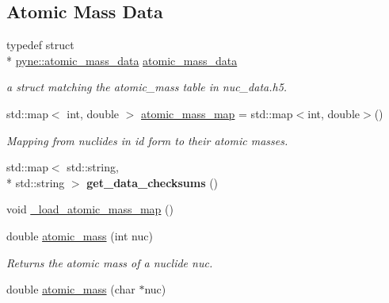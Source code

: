 \subsection*{Atomic Mass Data}
\begin{DoxyCompactItemize}
\item 
\hypertarget{namespacepyne_a4d33f77321c43a895b32c56b0c4b9256}{typedef struct \\*
\hyperlink{structpyne_1_1atomic__mass__data}{pyne\+::atomic\+\_\+mass\+\_\+data} \hyperlink{namespacepyne_a4d33f77321c43a895b32c56b0c4b9256}{atomic\+\_\+mass\+\_\+data}}\label{namespacepyne_a4d33f77321c43a895b32c56b0c4b9256}

\begin{DoxyCompactList}\small\item\em a struct matching the atomic\+\_\+mass table in nuc\+\_\+data.\+h5. \end{DoxyCompactList}\item 
\hypertarget{namespacepyne_ad57b70e4dd814b1efc458ff58641bcef}{std\+::map$<$ int, double $>$ \hyperlink{namespacepyne_ad57b70e4dd814b1efc458ff58641bcef}{atomic\+\_\+mass\+\_\+map} = std\+::map$<$int, double$>$()}\label{namespacepyne_ad57b70e4dd814b1efc458ff58641bcef}

\begin{DoxyCompactList}\small\item\em Mapping from nuclides in id form to their atomic masses. \end{DoxyCompactList}\item 
\hypertarget{namespacepyne_a7ffac869653ccaac71a565704630ae43}{std\+::map$<$ std\+::string, \\*
std\+::string $>$ {\bfseries get\+\_\+data\+\_\+checksums} ()}\label{namespacepyne_a7ffac869653ccaac71a565704630ae43}

\item 
void \hyperlink{namespacepyne_afc84ecca5a23b416bd3bf42b0756e68e}{\+\_\+load\+\_\+atomic\+\_\+mass\+\_\+map} ()
\item 
double \hyperlink{namespacepyne_aaab79c2417fc60c1a248dd702403befb}{atomic\+\_\+mass} (int nuc)
\begin{DoxyCompactList}\small\item\em Returns the atomic mass of a nuclide {\itshape nuc}. \end{DoxyCompactList}\item 
\hypertarget{namespacepyne_a070a35bbdb0217ff8c4b222572912f87}{double \hyperlink{namespacepyne_a070a35bbdb0217ff8c4b222572912f87}{atomic\+\_\+mass} (char $\ast$nuc)}\label{namespacepyne_a070a35bbdb0217ff8c4b222572912f87}


\end{DoxyCompactItemize}
